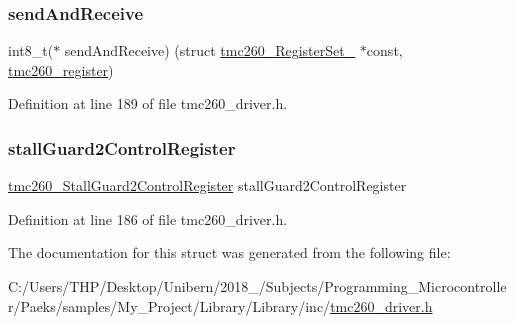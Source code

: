 \subsubsection{\texorpdfstring{send\+And\+Receive}{sendAndReceive}}
{\footnotesize\ttfamily int8\+\_\+t($\ast$  send\+And\+Receive) (struct \mbox{\hyperlink{structtmc260___register_set__}{tmc260\+\_\+\+Register\+Set\+\_\+}} $\ast$const, \mbox{\hyperlink{tmc260__driver_8h_a4552d2ee758c08501723a6dc78d26dc7}{tmc260\+\_\+register}})}



Definition at line 189 of file tmc260\+\_\+driver.\+h.

\mbox{\label{structtmc260___register_set___a259edf50b3ce148e4cee8d78134f021b}} 
\subsubsection{\texorpdfstring{stall\+Guard2\+Control\+Register}{stallGuard2ControlRegister}}
{\footnotesize\ttfamily \mbox{\hyperlink{tmc260__driver_8h_afa0a9cd31ee349e1fea8ff665665ad45}{tmc260\+\_\+\+Stall\+Guard2\+Control\+Register}} stall\+Guard2\+Control\+Register}



Definition at line 186 of file tmc260\+\_\+driver.\+h.



The documentation for this struct was generated from the following file\+:\begin{DoxyCompactItemize}
\item 
C\+:/\+Users/\+T\+H\+P/\+Desktop/\+Unibern/2018\+\_/\+Subjects/\+Programming\+\_\+\+Microcontroller/\+Paeks/samples/\+My\+\_\+\+Project/\+Library/\+Library/inc/\mbox{\hyperlink{tmc260__driver_8h}{tmc260\+\_\+driver.\+h}}\end{DoxyCompactItemize}
